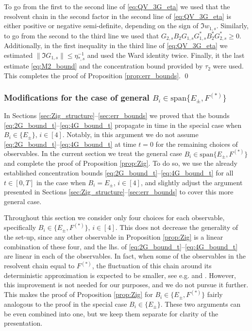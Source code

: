 \documentclass[10pt]{amsart}
\numberwithin{equation}{section}
\begin{document}
To go from the first to the second line of \eqref{eq:QV_3G_eta} we used that the resolvent chain in the second factor in the second line of \eqref{eq:QV_3G_eta} is either positive or negative semi-definite, depending on the sign of $\Im w_{1,s}$. Similarly, to go from the second to the third line we used that $G_{2,s} B_2 G_{1,s}G_{1,s}^* B_2^* G_{2,s}^*\ge 0$. Additionally, in the first inequality in the third line of \eqref{eq:QV_3G_eta} we estimated $\|\Im G_{1,s}\|\le \eta_{*,s}^{-1}$ and used the Ward identity twice. Finally, it the last estimate \eqref{eq:M2_bound} and the concentration bound provided by $\tau_2$ were used. This completes the proof of Proposition \ref{prop:err_bounds}. \qed






\subsubsection{Modifications for the case of general $B_i\in\mathrm{span}\{E_\pm, F^{(*)}\}$}\label{sec:general_B}

In Sections \ref{sec:Zig_structure}--\ref{sec:err_bounds} we proved that the bounds \eqref{eq:2G_bound_t}--\eqref{eq:4G_bound_t} propagate in time in the special case when $B_i\in\{E_\pm\}$, $i\in [4]$. Notably, in this argument we do not assume \eqref{eq:2G_bound_t}--\eqref{eq:4G_bound_t} at time $t=0$ for the remaining choices of observables. In the current section we treat the general case $B_i\in\mathrm{span}\{E_\pm,F^{(*)}\}$ and complete the proof of Proposition \ref{prop:Zig}. To do so, we use the already established concentration bounds \eqref{eq:2G_bound_t}--\eqref{eq:4G_bound_t} for all $t\in [0,T]$ in the case when $B_i=E_\pm$, $i\in [4]$, and slightly adjust the argument presented in Sections \ref{sec:Zig_structure}--\ref{sec:err_bounds} to cover this more general case.


Throughout this section we consider only four choices for each observable, specifically $B_i\in \{E_\pm, F^{(*)}\}$, $i\in [4]$. This does not decrease the generality of the set-up, since any other observable in Proposition \ref{prop:Zig} is a linear combination of these four, and the lhs. of \eqref{eq:2G_bound_t}--\eqref{eq:4G_bound_t} are linear in each of the observables. In fact, when some of the observables in the resolvent chain equal to $F^{(*)}$, the fluctuation of this chain around its deterministic approximation is expected to be smaller, see e.g. \cite[Theorem~4.4]{non-herm_overlaps} and \cite[Theorem~3.5]{univ_extr}. However, this improvement is not needed for our purposes, and we do not pursue it further. This makes the proof of Proposition \ref{prop:Zig} for $B_i\in \{E_\pm, F^{(*)}\}$ fairly analogous to the proof in the special case $B_i\in \{E_\pm\}$. These two arguments can be even combined into one, but we keep them separate for clarity of the presentation.
\end{document}
